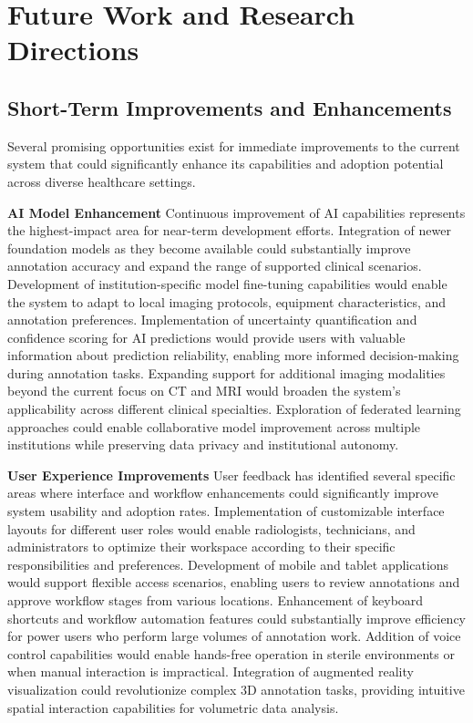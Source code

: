 \section{Future Work and Research Directions}

\subsection{Short-Term Improvements and Enhancements}

Several promising opportunities exist for immediate improvements to the current system that could significantly enhance its capabilities and adoption potential across diverse healthcare settings.

\textbf{AI Model Enhancement}
Continuous improvement of AI capabilities represents the highest-impact area for near-term development efforts. Integration of newer foundation models as they become available could substantially improve annotation accuracy and expand the range of supported clinical scenarios. Development of institution-specific model fine-tuning capabilities would enable the system to adapt to local imaging protocols, equipment characteristics, and annotation preferences. Implementation of uncertainty quantification and confidence scoring for AI predictions would provide users with valuable information about prediction reliability, enabling more informed decision-making during annotation tasks. Expanding support for additional imaging modalities beyond the current focus on CT and MRI would broaden the system's applicability across different clinical specialties. Exploration of federated learning approaches could enable collaborative model improvement across multiple institutions while preserving data privacy and institutional autonomy.

\textbf{User Experience Improvements}
User feedback has identified several specific areas where interface and workflow enhancements could significantly improve system usability and adoption rates. Implementation of customizable interface layouts for different user roles would enable radiologists, technicians, and administrators to optimize their workspace according to their specific responsibilities and preferences. Development of mobile and tablet applications would support flexible access scenarios, enabling users to review annotations and approve workflow stages from various locations. Enhancement of keyboard shortcuts and workflow automation features could substantially improve efficiency for power users who perform large volumes of annotation work. Addition of voice control capabilities would enable hands-free operation in sterile environments or when manual interaction is impractical. Integration of augmented reality visualization could revolutionize complex 3D annotation tasks, providing intuitive spatial interaction capabilities for volumetric data analysis.

